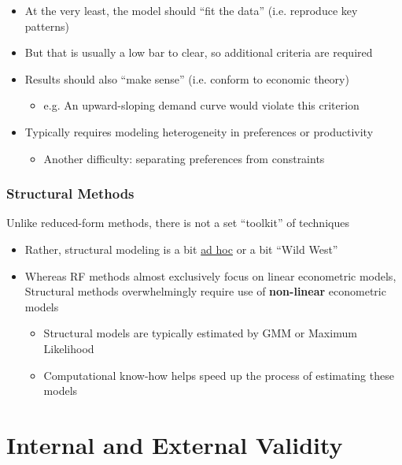 \documentclass[11pt]{article}
\begin{document}
\begin{itemize}
\item At the very least, the model should ``fit the data'' (i.e. reproduce key patterns)
\item But that is usually a low bar to clear, so additional criteria are required
\item Results should also ``make sense'' (i.e. conform to economic theory)
\begin{itemize}
\item e.g. An upward-sloping demand curve would violate this criterion
\end{itemize}
\item Typically requires modeling heterogeneity in preferences or productivity
\begin{itemize}
\item Another difficulty: separating preferences from constraints
\end{itemize}
\end{itemize}

\subsubsection{Structural Methods}
\label{sec:orgdbfd343}

Unlike reduced-form methods, there is not a set ``toolkit'' of techniques

\begin{itemize}
\item Rather, structural modeling is a bit \uline{ad hoc} or a bit ``Wild West''

\item Whereas RF methods almost exclusively focus on linear econometric models, Structural methods overwhelmingly require use of \textbf{non-linear} econometric models
\begin{itemize}
\item Structural models are typically estimated by GMM or Maximum Likelihood
\item Computational know-how helps speed up the process of estimating these models
\end{itemize}
\end{itemize}


\section{Internal and External Validity}
\label{sec:org96075f9}
\end{document}
